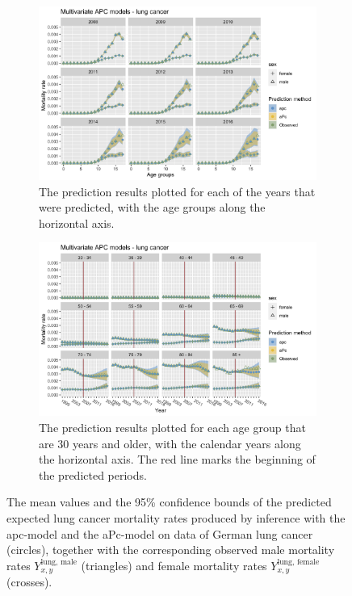 \begin{figure}[h!]
    \centering
    \begin{subfigure}[b]{.75\linewidth}
        \includegraphics[width=\linewidth]{real-data/real-data-multivariate/Figures/multivariate-APC-by-age-lung.png}
        \caption{The prediction results plotted for each of the years that were predicted, with the age groups along the horizontal axis.}
        \label{fig:mv-APC-lung-top}
    \end{subfigure}
    
    \begin{subfigure}[b]{.75\linewidth}
        \includegraphics[width=\linewidth]{real-data/real-data-multivariate/Figures/multivariate-APC-by-period-lung.png}
        \caption{The prediction results plotted for each age group that are 30 years and older, with the calendar years along the horizontal axis. The red line marks the beginning of the predicted periods.}
        \label{fig:mv-APC-lung-bottom}
    \end{subfigure}
    
    \caption{The mean values and the 95\% confidence bounds of the predicted expected lung cancer mortality rates produced by inference with the apc-model and the aPc-model on data of German lung cancer (circles), together with the corresponding observed male mortality rates $Y_{x,y}^{\text{lung, male}}$ (triangles) and female mortality rates $Y_{x,y}^{\text{lung, female}}$ (crosses).}
    \label{fig:mv-APC-lung}
\end{figure}

